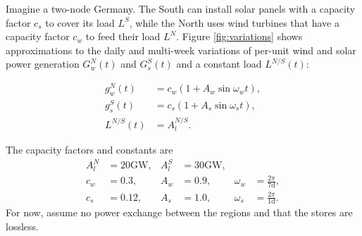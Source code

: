 \documentclass[11pt,a4paper,fleqn]{scrartcl}
\begin{document}
Imagine a two-node Germany. The South can install solar panels with a capacity factor $c_s$ to cover its load $L^S$, while the North uses wind turbines that have a capacity factor $c_w$
to feed their load $L^N$. Figure \ref{fig:variations} shows approximations to the daily and multi-week variations of per-unit wind and solar power generation \(G^{N}_{w}(t)\) and \(G^{S}_{s}(t)\) and a constant load \(L^{N/S}(t)\):

\begin{align*}
 g_{w}^N(t) & = c_w(1+A_w \sin \omega_w t), \\
 g_{s}^S(t) & = c_s(1+A_s \sin \omega_s t), \\
L^{N/S}(t) & = A_{l}^{N/S}.
\end{align*}

The capacity factors and constants are
\begin{align*}
A_{l}^{N} & = 20 \si{\giga\watt}, & A_{l}^{S} & = 30 \si{\giga\watt},                                         \\
 c_w    & = 0.3,                & A_w     & = 0.9,                & \omega_w & = \frac{2\pi}{7 \text{d}}, \\
 c_s    & = 0.12,               & A_s     & = 1.0,                & \omega_s & = \frac{2\pi}{1 \text{d}}.
\end{align*}
\vspace{-0.3em}
For now, assume no power exchange between the regions and that the stores are lossless.
\end{document}
